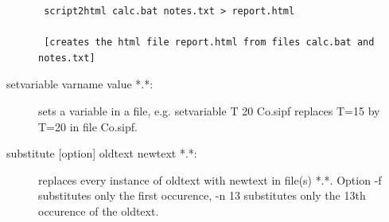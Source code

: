 \begin{description}
\begin{verbatim}
 script2html calc.bat notes.txt > report.html

 [creates the html file report.html from files calc.bat and notes.txt]
\end{verbatim}
\item [\prg setvariable\index{setvariable} varname value *.*:]
sets a variable in a file, e.g. {\prg setvariable T 20 Co.sipf} replaces
T=15 by T=20 in file {\prg Co.sipf}.
\item [\prg substitute\index{substitute} {[option]} oldtext newtext *.*:] replaces every instance of %
oldtext with newtext in file(s) *.*. Option {\prg -f} substitutes only the first occurence, 
{\prg -n 13} substitutes only the 13th occurence of the oldtext.
\end{description}


